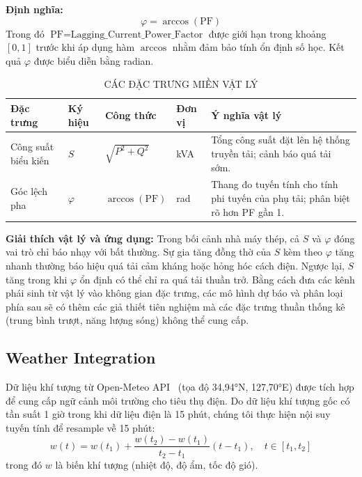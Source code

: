 \textbf{Định nghĩa:}
\begin{equation}
\varphi = \arccos(\text{PF})
\label{eq:phase}
\end{equation}
Trong đó $\text{PF} = \text{Lagging\_Current\_Power\_Factor}$ được giới hạn trong khoảng $[0, 1]$
trước khi áp dụng hàm $\arccos$ nhằm đảm bảo tính ổn định số học.
Kết quả $\varphi$ được biểu diễn bằng radian.

\begin{table}[htbp]
\caption{CÁC ĐẶC TRƯNG MIỀN VẬT LÝ}
\label{tab:physical}
\centering
\small
\begin{tabular}{@{}p{3.0cm}p{1.2cm}p{3.0cm}p{1.2cm}p{5.4cm}@{}}
\toprule
Đặc trưng & Ký hiệu & Công thức & Đơn vị & Ý nghĩa vật lý \\
\midrule
Công suất biểu kiến & $S$ & $\sqrt{P^2+Q^2}$ & kVA & Tổng công suất đặt lên hệ thống truyền tải; cảnh báo quá tải sớm. \\
Góc lệch pha & $\varphi$ & $\arccos(\mathrm{PF})$ & rad & Thang đo tuyến tính cho tính phi tuyến của phụ tải; phân biệt rõ hơn PF gần 1. \\
\bottomrule
\end{tabular}
\end{table}

\textbf{Giải thích vật lý và ứng dụng:}
Trong bối cảnh nhà máy thép, cả $S$ và $\varphi$ đóng vai trò chỉ báo nhạy với bất thường.
Sự gia tăng đồng thờ của $S$ kèm theo $\varphi$ tăng nhanh thường báo hiệu quá tải cảm kháng hoặc hỏng hóc cách điện.
Ngược lại, $S$ tăng trong khi $\varphi$ ổn định có thể chỉ ra quá tải thuần trở.
Bằng cách đưa các kênh phái sinh từ vật lý vào không gian đặc trưng,
các mô hình dự báo và phân loại phía sau sẽ có thêm các giả thiết tiên nghiệm
mà các đặc trưng thuần thống kê (trung bình trượt, năng lượng sóng) không thể cung cấp.

\subsection{Weather Integration}

Dữ liệu khí tượng từ Open-Meteo API~\cite{openmeteo2026} (tọa độ 34,94°N, 127,70°E)
được tích hợp để cung cấp ngữ cảnh môi trường cho tiêu thụ điện.
Do dữ liệu khí tượng gốc có tần suất 1 giờ trong khi dữ liệu điện là 15 phút,
chúng tôi thực hiện nội suy tuyến tính để resample về 15 phút:
\begin{equation}
w(t) = w(t_1) + \frac{w(t_2) - w(t_1)}{t_2 - t_1}(t - t_1), \quad t \in [t_1, t_2]
\label{eq:weather_interp}
\end{equation}
trong đó $w$ là biến khí tượng (nhiệt độ, độ ẩm, tốc độ gió).

